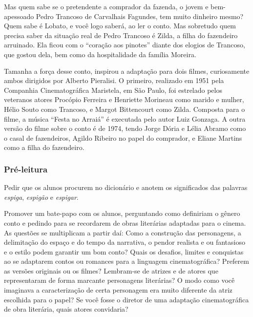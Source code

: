 \documentclass[11pt]{extarticle}
\begin{document}
Mas quem sabe se o pretendente a comprador da fazenda, o jovem e
bem-apessoado Pedro Trancoso de Carvalhais Fagundes, tem muito dinheiro
mesmo? Quem sabe é Lobato, e você logo saberá, ao ler o conto. Mas
sobretudo quem precisa saber da situação real de Pedro Trancoso é Zilda,
a filha do fazendeiro arruinado. Ela ficou com o ``coração aos pinotes''
diante dos elogios de Trancoso, que gostou dela, bem como da
hospitalidade da família Moreira.

Tamanha a força desse conto, inspirou a adaptação para dois filmes,
curiosamente ambos dirigidos por Alberto Pieralisi. O primeiro,
realizado em 1951 pela Companhia Cinematográfica Maristela, em São
Paulo, foi estrelado pelos veteranos atores Procópio Ferreira e
Henriette Morineau como marido e mulher, Hélio Souto como Trancoso, e
Margot Bittencourt como Zilda. Composta para o filme, a música ``Festa
no Arraiá'' é executada pelo autor Luiz Gonzaga. A outra versão do filme
sobre o conto é de 1974, tendo Jorge Dória e Lélia Abramo como o casal
de fazendeiros, Agildo Ribeiro no papel do comprador, e Eliane Martins
como a filha do fazendeiro.


\subsubsection{Pré-leitura}

Pedir que os alunos procurem no dicionário e anotem os significados das
palavras \emph{espiga}, \emph{espigão} e \emph{espigar}.

Promover um bate-papo com os alunos, perguntando como definiriam o
gênero conto e pedindo para se recordarem de obras literárias adaptadas
para o cinema. As questões se multiplicam a partir daí: Como a
construção das personagens, a delimitação do espaço e do tempo da
narrativa, o pendor realista e ou fantasioso e o estilo podem garantir
um bom conto? Quais os desafios, limites e conquistas ao se adaptarem
contos ou romances para a linguagem cinematográfica? Preferem as versões
originais ou os filmes? Lembram-se de atrizes e de atores que
representaram de forma marcante personagens literárias? O modo como você
imaginava a caracterização de certa personagem era muito diferente da
atriz escolhida para o papel? Se você fosse o diretor de uma adaptação
cinematográfica de obra literária, quais atores convidaria?
\end{document}
